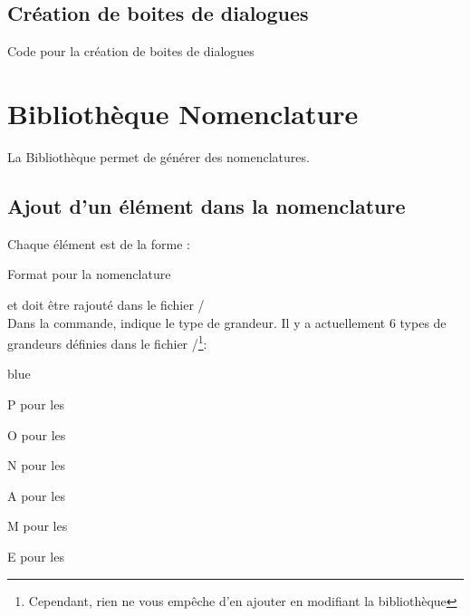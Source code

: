 {\section{Création de boites de dialogues}


\begin{Latex}{Code pour la création de boites de dialogues}
\end{Latex}



\chapter{Bibliothèque Nomenclature}
\label{addNomenclature}

La Bibliothèque  permet de générer des nomenclatures.

\section{Ajout d'un élément dans la nomenclature}

Chaque élément est de la forme :\\

\begin{Latex}{Format pour la nomenclature}

\end{Latex}
et doit être rajouté dans le fichier /\\


Dans la commande,  indique le type de grandeur. Il y a actuellement 6 types de grandeurs définies dans le fichier /\footnote{Cependant, rien ne vous empêche d'en ajouter en modifiant la bibliothèque}: 

\begin{items}{blue}{\Bullet}
\item P pour les 
\item O pour les 
\item N pour les 
\item A pour les 
\item M pour les 
\item E pour les 
\end{items}  


}
